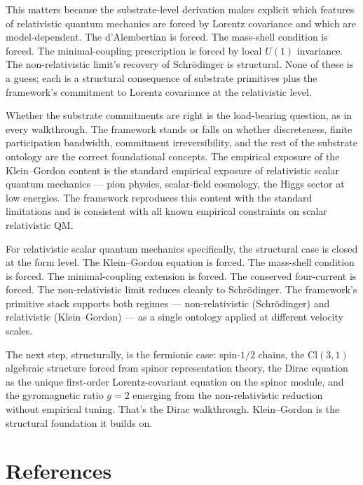 \documentclass[11pt,a4paper]{article}
\begin{document}
This matters because the substrate-level derivation makes explicit which features of relativistic quantum mechanics are forced by Lorentz covariance and which are model-dependent. The d'Alembertian is forced. The mass-shell condition is forced. The minimal-coupling prescription is forced by local $U(1)$ invariance. The non-relativistic limit's recovery of Schr\"odinger is structural. None of these is a guess; each is a structural consequence of substrate primitives plus the framework's commitment to Lorentz covariance at the relativistic level.

Whether the substrate commitments are right is the load-bearing question, as in every walkthrough. The framework stands or falls on whether discreteness, finite participation bandwidth, commitment irreversibility, and the rest of the substrate ontology are the correct foundational concepts. The empirical exposure of the Klein--Gordon content is the standard empirical exposure of relativistic scalar quantum mechanics --- pion physics, scalar-field cosmology, the Higgs sector at low energies. The framework reproduces this content with the standard limitations and is consistent with all known empirical constraints on scalar relativistic QM.

For relativistic scalar quantum mechanics specifically, the structural case is closed at the form level. The Klein--Gordon equation is forced. The mass-shell condition is forced. The minimal-coupling extension is forced. The conserved four-current is forced. The non-relativistic limit reduces cleanly to Schr\"odinger. The framework's primitive stack supports both regimes --- non-relativistic (Schr\"odinger) and relativistic (Klein--Gordon) --- as a single ontology applied at different velocity scales.

The next step, structurally, is the fermionic case: spin-$1/2$ chains, the $\mathrm{Cl}(3,1)$ algebraic structure forced from spinor representation theory, the Dirac equation as the unique first-order Lorentz-covariant equation on the spinor module, and the gyromagnetic ratio $g = 2$ emerging from the non-relativistic reduction without empirical tuning. That's the Dirac walkthrough. Klein--Gordon is the structural foundation it builds on.

\section*{References}
\end{document}
